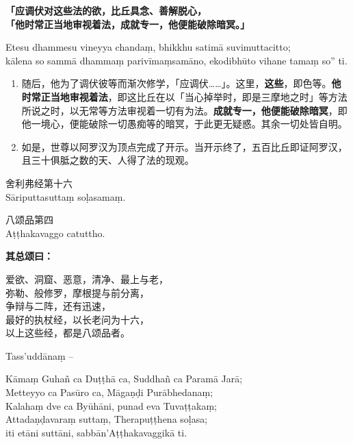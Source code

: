 \textbf{「应调伏对这些法的欲，比丘具念、善解脱心，\\}
\textbf{「他时常正当地审视着法，成就专一，他便能破除暗冥。」}

Etesu dhammesu vineyya chandaṃ, bhikkhu satimā suvimuttacitto;\\
kālena so sammā dhammaṃ parivīmaṃsamāno, ekodibhūto vihane tamaṃ so” ti. %

\begin{enumerate}\item 随后，他为了调伏彼等而渐次修学，「应调伏……」。这里，\textbf{这些}，即色等。\textbf{他时常正当地审视着法}，即这比丘在以「当心掉举时，即是三摩地之时」等方法所说之时，以无常等方法审视着一切有为法。\textbf{成就专一，他便能破除暗冥}，即他一境心，便能破除一切愚痴等的暗冥，于此更无疑惑。其余一切处皆自明。
\item 如是，世尊以阿罗汉为顶点完成了开示。当开示终了，五百比丘即证阿罗汉，且三十俱胝之数的天、人得了法的现观。\end{enumerate}

\begin{center}\vspace{1em}舍利弗经第十六\\Sāriputtasuttaṃ soḷasamaṃ.\end{center}

\begin{center}\vspace{1em}八颂品第四\\Aṭṭhakavaggo catuttho.\end{center}

\textbf{其总颂曰：}

\begin{quoting}爱欲、洞窟、恶意，清净、最上与老，\\弥勒、般修罗，摩根提与前分离，\\争辩与二阵，还有迅速，\\最好的执杖经，以长老问为十六，\\以上这些经，都是八颂品者。\end{quoting}

Tass’uddānaṃ –

\begin{quoting}Kāmaṃ Guhañ ca Duṭṭhā ca, Suddhañ ca Paramā Jarā;\\Metteyyo ca Pasūro ca, Māgaṇḍi Purābhedanaṃ;\\Kalahaṃ dve ca Byūhāni, punad eva Tuvaṭṭakaṃ;\\Attadaṇḍavaraṃ suttaṃ, Therapuṭṭhena soḷasa;\\iti etāni suttāni, sabbān’Aṭṭhakavaggikā ti.\end{quoting}

